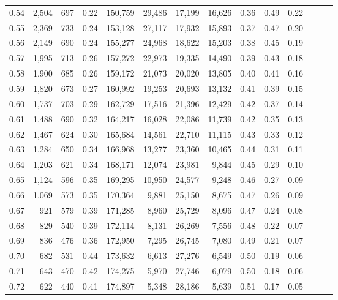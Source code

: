 \begin{tabular}{rrrrrrrrrrrrrr}
0.54 &  2,504 &  697 &  0.22 &  150,759 &   29,486 &  17,199 &  16,626 &  0.36 &  0.49 &      0.22 \\
0.55 &  2,369 &  733 &  0.24 &  153,128 &   27,117 &  17,932 &  15,893 &  0.37 &  0.47 &      0.20 \\
0.56 &  2,149 &  690 &  0.24 &  155,277 &   24,968 &  18,622 &  15,203 &  0.38 &  0.45 &      0.19 \\
0.57 &  1,995 &  713 &  0.26 &  157,272 &   22,973 &  19,335 &  14,490 &  0.39 &  0.43 &      0.18 \\
0.58 &  1,900 &  685 &  0.26 &  159,172 &   21,073 &  20,020 &  13,805 &  0.40 &  0.41 &      0.16 \\
0.59 &  1,820 &  673 &  0.27 &  160,992 &   19,253 &  20,693 &  13,132 &  0.41 &  0.39 &      0.15 \\
0.60 &  1,737 &  703 &  0.29 &  162,729 &   17,516 &  21,396 &  12,429 &  0.42 &  0.37 &      0.14 \\
0.61 &  1,488 &  690 &  0.32 &  164,217 &   16,028 &  22,086 &  11,739 &  0.42 &  0.35 &      0.13 \\
0.62 &  1,467 &  624 &  0.30 &  165,684 &   14,561 &  22,710 &  11,115 &  0.43 &  0.33 &      0.12 \\
0.63 &  1,284 &  650 &  0.34 &  166,968 &   13,277 &  23,360 &  10,465 &  0.44 &  0.31 &      0.11 \\
0.64 &  1,203 &  621 &  0.34 &  168,171 &   12,074 &  23,981 &   9,844 &  0.45 &  0.29 &      0.10 \\
0.65 &  1,124 &  596 &  0.35 &  169,295 &   10,950 &  24,577 &   9,248 &  0.46 &  0.27 &      0.09 \\
0.66 &  1,069 &  573 &  0.35 &  170,364 &    9,881 &  25,150 &   8,675 &  0.47 &  0.26 &      0.09 \\
0.67 &    921 &  579 &  0.39 &  171,285 &    8,960 &  25,729 &   8,096 &  0.47 &  0.24 &      0.08 \\
0.68 &    829 &  540 &  0.39 &  172,114 &    8,131 &  26,269 &   7,556 &  0.48 &  0.22 &      0.07 \\
0.69 &    836 &  476 &  0.36 &  172,950 &    7,295 &  26,745 &   7,080 &  0.49 &  0.21 &      0.07 \\
0.70 &    682 &  531 &  0.44 &  173,632 &    6,613 &  27,276 &   6,549 &  0.50 &  0.19 &      0.06 \\
0.71 &    643 &  470 &  0.42 &  174,275 &    5,970 &  27,746 &   6,079 &  0.50 &  0.18 &      0.06 \\
0.72 &    622 &  440 &  0.41 &  174,897 &    5,348 &  28,186 &   5,639 &  0.51 &  0.17 &      0.05 \\

\end{tabular}
